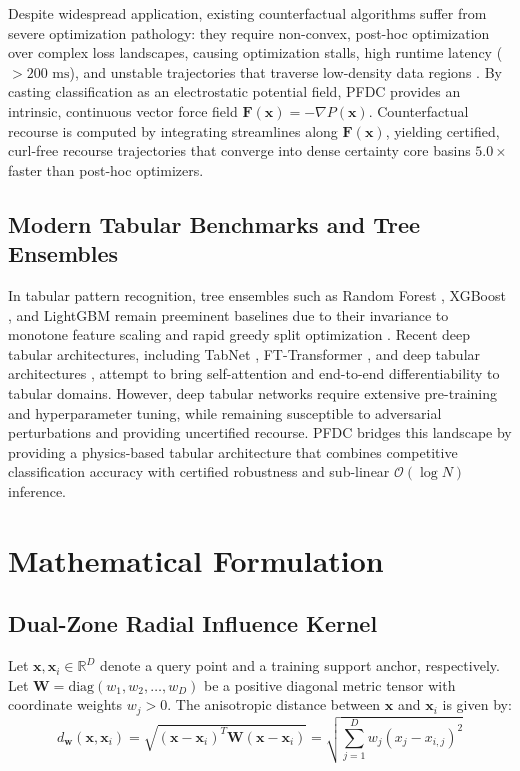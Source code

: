 \documentclass[times, review, 10pt]{elsarticle}
\begin{document}
Despite widespread application, existing counterfactual algorithms suffer from severe optimization pathology: they require non-convex, post-hoc optimization over complex loss landscapes, causing optimization stalls, high runtime latency ($>200\text{ ms}$), and unstable trajectories that traverse low-density data regions \cite{verma2022counterfactual_tpami}. By casting classification as an electrostatic potential field, PFDC provides an intrinsic, continuous vector force field $\mathbf{F}(\mathbf{x}) = -\nabla P(\mathbf{x})$. Counterfactual recourse is computed by integrating streamlines along $\mathbf{F}(\mathbf{x})$, yielding certified, curl-free recourse trajectories that converge into dense certainty core basins $5.0\times$ faster than post-hoc optimizers.

\subsection{Modern Tabular Benchmarks and Tree Ensembles}
In tabular pattern recognition, tree ensembles such as Random Forest \cite{breiman2001random}, XGBoost \cite{chen2016xgboost}, and LightGBM \cite{ke2017lightgbm} remain preeminent baselines due to their invariance to monotone feature scaling and rapid greedy split optimization \cite{friedman2001greedy}. Recent deep tabular architectures, including TabNet \cite{arik2021tabnet}, FT-Transformer \cite{gorishniy2021revisiting}, and deep tabular architectures \cite{arik2021tabnet,gorishniy2021revisiting}, attempt to bring self-attention and end-to-end differentiability to tabular domains. However, deep tabular networks require extensive pre-training and hyperparameter tuning, while remaining susceptible to adversarial perturbations and providing uncertified recourse. PFDC bridges this landscape by providing a physics-based tabular architecture that combines competitive classification accuracy with certified robustness and sub-linear $\mathcal{O}(\log N)$ inference.

\section{Mathematical Formulation}
\label{sec:math}

\subsection{Dual-Zone Radial Influence Kernel}
Let $\mathbf{x}, \mathbf{x}_i \in \mathbb{R}^D$ denote a query point and a training support anchor, respectively. Let $\mathbf{W} = \mathrm{diag}(w_1, w_2, \dots, w_D)$ be a positive diagonal metric tensor with coordinate weights $w_j > 0$. The anisotropic distance between $\mathbf{x}$ and $\mathbf{x}_i$ is given by:
\begin{equation}
d_{\mathbf{w}}(\mathbf{x}, \mathbf{x}_i) = \sqrt{(\mathbf{x} - \mathbf{x}_i)^T \mathbf{W} (\mathbf{x} - \mathbf{x}_i)} = \sqrt{\sum_{j=1}^D w_j (x_j - x_{i,j})^2}
\label{eq:aniso_dist}
\end{equation}
\end{document}
